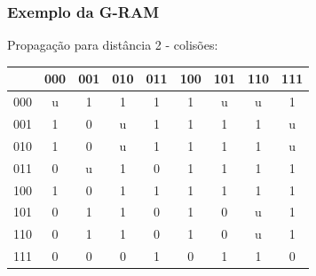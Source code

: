 \documentclass{beamer}
\begin{document}
\begin{frame}
    \frametitle{Exemplo da G-RAM}
    Propagação para distância 2 - colisões:

    \begin{table}
        \centering
        \begin{tabular}{|c|c|c|c|c|c|c|c|c|}
            \hline
                &       000 &       001 &       010 &       011 &       100 &       101 &       110 &       111\\
            \hline
            000 &        u  &        1  &        1  &        1  &        1  &        u  &        u  &        1 \\
            \hline
            001 &        1  & \alert 0  &        u  &        1  &        1  &        1  &        1  &        u \\
            \hline
            010 &        1  & \alert 0  &        u  &        1  &        1  &        1  &        1  &        u \\
            \hline
            011 & \alert 0  &        u  &        1  & \alert 0  &        1  &        1  &        1  &        1 \\
            \hline
            100 &        1  & \alert 0  &        1  &        1  &        1  &        1  &        1  &        1 \\
            \hline
            101 & \alert 0  &        1  &        1  & \alert 0  &        1  & \alert 0  &        u  &        1 \\
            \hline
            110 & \alert 0  &        1  &        1  & \alert 0  &        1  & \alert 0  &        u  &        1 \\
            \hline
            111 &        0  &        0  & \alert 0  &        1  & \alert 0  &        1  &        1  & \alert 0 \\
            \hline

        \end{tabular}
    \end{table}
\end{frame}
\end{document}
